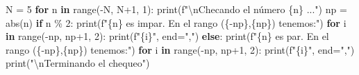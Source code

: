 \documentclass[
  spanish,
  letterpaper,
]{scrbook}
\newenvironment{Shaded}{\begin{snugshade}}{\end{snugshade}}
\newcommand{\BuiltInTok}[1]{\textcolor[rgb]{0.00,0.23,0.31}{#1}}
\newcommand{\CharTok}[1]{\textcolor[rgb]{0.13,0.47,0.30}{#1}}
\newcommand{\ControlFlowTok}[1]{\textcolor[rgb]{0.00,0.23,0.31}{\textbf{#1}}}
\newcommand{\DecValTok}[1]{\textcolor[rgb]{0.68,0.00,0.00}{#1}}
\newcommand{\KeywordTok}[1]{\textcolor[rgb]{0.00,0.23,0.31}{\textbf{#1}}}
\newcommand{\NormalTok}[1]{\textcolor[rgb]{0.00,0.23,0.31}{#1}}
\newcommand{\OperatorTok}[1]{\textcolor[rgb]{0.37,0.37,0.37}{#1}}
\newcommand{\SpecialCharTok}[1]{\textcolor[rgb]{0.37,0.37,0.37}{#1}}
\newcommand{\SpecialStringTok}[1]{\textcolor[rgb]{0.13,0.47,0.30}{#1}}
\newcommand{\StringTok}[1]{\textcolor[rgb]{0.13,0.47,0.30}{#1}}
\theoremstyle{definition}
\theoremstyle{remark}
\begin{document}
\begin{Shaded}
\begin{Highlighting}[]
\NormalTok{N }\OperatorTok{=} \DecValTok{5}
\ControlFlowTok{for}\NormalTok{ n }\KeywordTok{in} \BuiltInTok{range}\NormalTok{(}\OperatorTok{{-}}\NormalTok{N, N}\OperatorTok{+}\DecValTok{1}\NormalTok{, }\DecValTok{1}\NormalTok{):}
    \BuiltInTok{print}\NormalTok{(}\SpecialStringTok{f"}\CharTok{\textbackslash{}n}\SpecialStringTok{Checando el número }\SpecialCharTok{\{}\NormalTok{n}\SpecialCharTok{\}}\SpecialStringTok{ ..."}\NormalTok{)}
\NormalTok{    np }\OperatorTok{=} \BuiltInTok{abs}\NormalTok{(n)}
    \ControlFlowTok{if}\NormalTok{ n }\OperatorTok{\%} \DecValTok{2}\NormalTok{:}
        \BuiltInTok{print}\NormalTok{(}\SpecialStringTok{f"}\SpecialCharTok{\{}\NormalTok{n}\SpecialCharTok{\}}\SpecialStringTok{ es impar. En el rango (}\SpecialCharTok{\{}\OperatorTok{{-}}\NormalTok{np}\SpecialCharTok{\}}\SpecialStringTok{,}\SpecialCharTok{\{}\NormalTok{np}\SpecialCharTok{\}}\SpecialStringTok{) tenemos:"}\NormalTok{)}
        \ControlFlowTok{for}\NormalTok{ i }\KeywordTok{in} \BuiltInTok{range}\NormalTok{(}\OperatorTok{{-}}\NormalTok{np, np}\OperatorTok{+}\DecValTok{1}\NormalTok{, }\DecValTok{2}\NormalTok{):}
            \BuiltInTok{print}\NormalTok{(}\SpecialStringTok{f"}\SpecialCharTok{\{}\NormalTok{i}\SpecialCharTok{\}}\SpecialStringTok{"}\NormalTok{, end}\OperatorTok{=}\StringTok{","}\NormalTok{)}
    \ControlFlowTok{else}\NormalTok{:}
        \BuiltInTok{print}\NormalTok{(}\SpecialStringTok{f"}\SpecialCharTok{\{}\NormalTok{n}\SpecialCharTok{\}}\SpecialStringTok{ es par. En el rango (}\SpecialCharTok{\{}\OperatorTok{{-}}\NormalTok{np}\SpecialCharTok{\}}\SpecialStringTok{,}\SpecialCharTok{\{}\NormalTok{np}\SpecialCharTok{\}}\SpecialStringTok{) tenemos:"}\NormalTok{)}
        \ControlFlowTok{for}\NormalTok{ i }\KeywordTok{in} \BuiltInTok{range}\NormalTok{(}\OperatorTok{{-}}\NormalTok{np, np}\OperatorTok{+}\DecValTok{1}\NormalTok{, }\DecValTok{2}\NormalTok{):}
            \BuiltInTok{print}\NormalTok{(}\SpecialStringTok{f"}\SpecialCharTok{\{}\NormalTok{i}\SpecialCharTok{\}}\SpecialStringTok{"}\NormalTok{, end}\OperatorTok{=}\StringTok{","}\NormalTok{)}
    \BuiltInTok{print}\NormalTok{(}\StringTok{"}\CharTok{\textbackslash{}n}\StringTok{Terminando el chequeo"}\NormalTok{)}
\end{Highlighting}
\end{Shaded}
\end{document}
